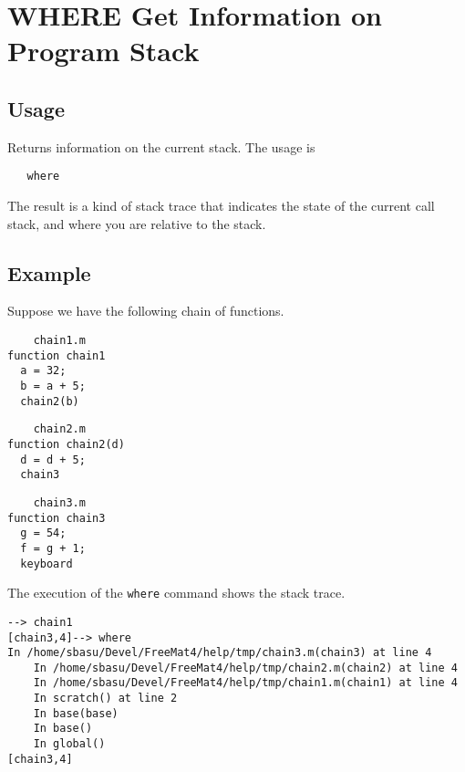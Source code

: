 \section{WHERE Get Information on Program Stack}

\subsection{Usage}

Returns information on the current stack.  The usage is
\begin{verbatim}
   where
\end{verbatim}
The result is a kind of stack trace that indicates the state
of the current call stack, and where you are relative to the
stack.
\subsection{Example}

Suppose we have the following chain of functions.
\begin{verbatim}
    chain1.m
function chain1
  a = 32;
  b = a + 5;
  chain2(b)
\end{verbatim}
\begin{verbatim}
    chain2.m
function chain2(d)
  d = d + 5;
  chain3
\end{verbatim}
\begin{verbatim}
    chain3.m
function chain3
  g = 54;
  f = g + 1;
  keyboard
\end{verbatim}
The execution of the \verb|where| command shows the stack trace.
\begin{verbatim}
--> chain1
[chain3,4]--> where
In /home/sbasu/Devel/FreeMat4/help/tmp/chain3.m(chain3) at line 4
    In /home/sbasu/Devel/FreeMat4/help/tmp/chain2.m(chain2) at line 4
    In /home/sbasu/Devel/FreeMat4/help/tmp/chain1.m(chain1) at line 4
    In scratch() at line 2
    In base(base)
    In base()
    In global()
[chain3,4]
\end{verbatim}
